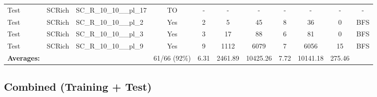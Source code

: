 \documentclass{article}
\begin{document}
\begin{tabular}{lllcccccccc}
Test & SCRich & SC\_R\_10\_10\_\_pl\_17 & TO & - & - & - & - & - & - & - \\
Test & SCRich & SC\_R\_10\_10\_\_pl\_2 & Yes & 2 & 5 & 45 & 8 & 36 & 0 & BFS \\
Test & SCRich & SC\_R\_10\_10\_\_pl\_3 & Yes & 3 & 17 & 88 & 6 & 81 & 0 & BFS \\
Test & SCRich & SC\_R\_10\_10\_\_pl\_9 & Yes & 9 & 1112 & 6079 & 7 & 6056 & 15 & BFS \\
\textbf{Averages:} & & & 61/66 (92\%) & 6.31 & 2461.89 & 10425.26 & 7.72 & 10141.18 & 275.46 & \\
\bottomrule
\end{tabular}
\newpage
\subsection*{Combined (Training + Test)}
\end{document}
